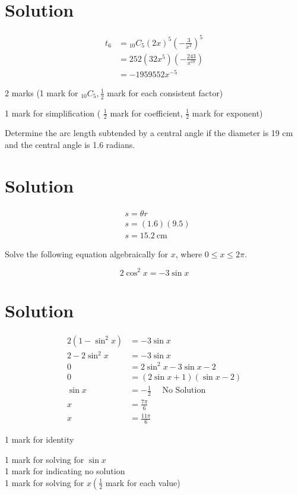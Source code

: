\documentclass[10pt]{article}
\begin{document}
\section*{Solution}
$$
\begin{aligned}
t_{6} & ={ }_{10} C_{5}(2 x)^{5}\left(-\frac{3}{x^{2}}\right)^{5} \\
& =252\left(32 x^{5}\right)\left(-\frac{243}{x^{10}}\right) \\
& =-1959552 x^{-5}
\end{aligned}
$$

2 marks (1 mark for ${ }_{10} C_{5}, \frac{1}{2}$ mark for each consistent factor)

1 mark for simplification ( $\frac{1}{2}$ mark for coefficient, $\frac{1}{2}$ mark for exponent)

Determine the arc length subtended by a central angle if the diameter is 19 cm and the central angle is 1.6 radians.

\section*{Solution}
$$
\begin{aligned}
& s=\theta r \\
& s=(1.6)(9.5) \\
& s=15.2 \mathrm{~cm}
\end{aligned}
$$

Solve the following equation algebraically for $x$, where $0 \leq x \leq 2 \pi$.

$$
2 \cos ^{2} x=-3 \sin x
$$

\section*{Solution}
$$
\begin{aligned}
2\left(1-\sin ^{2} x\right) & =-3 \sin x \\
2-2 \sin ^{2} x & =-3 \sin x \\
0 & =2 \sin ^{2} x-3 \sin x-2 \\
0 & =(2 \sin x+1)(\sin x-2) \\
\sin x & =-\frac{1}{2} \quad \text { No Solution } \\
x & =\frac{7 \pi}{6} \\
x & =\frac{11 \pi}{6}
\end{aligned}
$$

1 mark for identity

1 mark for solving for $\sin x$\\
1 mark for indicating no solution\\
1 mark for solving for $x\left(\frac{1}{2}\right.$ mark for each value)
\end{document}
